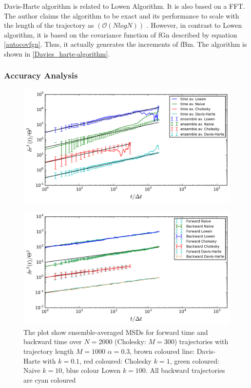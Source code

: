\documentclass[
  a4paper,BCOR10mm,twoside,
  headsepline,footsepline,%
  fleqn,openbib
]{scrbook}
\begin{document}
Davis-Harte algorithm \cite{DAVIES1987} is related to Lowen Algorithm. It is also based on a FFT. The author claims the algorithm to be exact and its performance to scale with the length of the trajectory as $(\mathcal{O}(NlogN))$ . However, in contrast to Lowen algorithm, it is based on the covariance function of fGn described by equation \cref{autocovfgn}. Thus, it actually generates the increments of fBm. The  algorithm is shown in \cref{Davies_harte-algorithm}. 
\subsubsection{Accuracy Analysis}
\begin{figure}[h!]
  \centering
  \includegraphics[width=\textwidth]{./data/timevsensambenew.png}
  \captionsetup{width=\linewidth}
  \label{fig:4}
\end{figure}
\begin{figure}[h!]
\centering
\includegraphics[width=\textwidth]{./data/changeintimenew.png}
\caption{The plot show ensemble-averaged MSDs for forward time and backward time over $N=2000$ (Cholesky: $M=300$) trajectories with trajectory length $M=1000$  $\alpha =0.3$,  brown coloured line: Davis-Harte with $k=0.1$, red coloured: Cholesky $k=1$, green coloured: Naive $k=10$, blue colour Lowen $k=100$. All backward trajectories are cyan coloured}
\label{changeintime}
\end{figure} 
\end{document}
